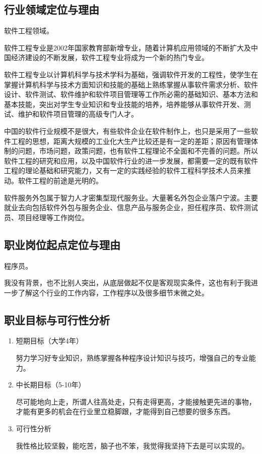 \documentclass{article}
\begin{document}
\subsection{行业领域定位与理由}
软件工程领域。\par
软件工程专业是2002年国家教育部新增专业，随着计算机应用领域的不断扩大及中国经济建设的不断发展，软件工程专业将成为一个新的热门专业。\par
软件工程专业以计算机科学与技术学科为基础，强调软件开发的工程性，使学生在掌握计算机科学与技术方面知识和技能的基础上熟练掌握从事软件需求分析、软件设计、软件测试、软件维护和软件项目管理等工作所必需的基础知识、基本方法和基本技能，突出对学生专业知识和专业技能的培养，培养能够从事软件开发、测试、维护和软件项目管理的高级专门人才。\par
中国的软件行业规模不是很大，有些软件企业在软件制作上，也只是采用了一些软件工程的思想，距离大规模的工业化大生产比较还是有一定的差距；原因有管理体制的问题，市场问题，政策问题，也有软件工程理论不全面和不完善的问题。所以软件工程的研究和应用，以及中国软件行业的进一步发展，都需要一定的既有软件工程的理论基础和研究能力，又有一定的实践经验的软件工程科学技术人员来推动。软件工程的前途是光明的。\par
软件服务外包属于智力人才密集型现代服务业。大量著名外包企业落户宁波。主要就业去向包括软件外包与服务企业、信息产品与服务企业，担任程序员、软件测试员、项目经理等工作岗位。\par
\subsection{职业岗位起点定位与理由}
程序员。\par
我没有背景，也不比别人突出，从底层做起不仅是客观现实条件，这也有利于我进一步了解这个行业的工作内容，工作程序以及很多细节末微之处。
\subsection{职业目标与可行性分析}
\par
\begin{enumerate}[(1)]
	\item 短期目标（大学4年）\par
努力学习好专业知识，熟练掌握各种程序设计知识与技巧，增强自己的专业能力。\par
	\item 中长期目标（5-10年）\par
尽可能地向上走，所谓人往高处走，只有走得更高，才能接触更先进的事物，才能有更多的机会在行业里立稳脚跟，才能得到自己想要的很多东西。\par
    \item 可行性分析\par
我性格比较坚毅，能吃苦，脑子也不笨，我觉得我坚持下去是可以实现的。\par  
\end{enumerate}
\end{document}
